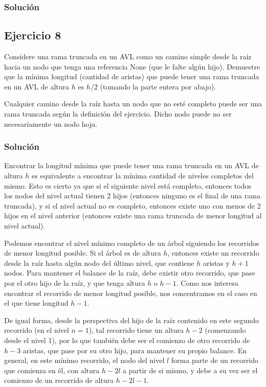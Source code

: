 \documentclass{article}
\begin{document}
\subsubsection*{Solución}



\subsection*{Ejercicio 8}
Considere una rama truncada en un AVL como un camino simple desde la raíz hacia un nodo que tenga una referencia None (que le falte algún hijo). Demuestre que la mínima longitud (cantidad de aristas) que puede tener una rama truncada en un AVL de altura $h$ es $h/2$ (tomando la parte entera por abajo).

Cualquier camino desde la raíz hasta un nodo que no esté completo puede ser una rama truncada según la definición del ejercicio. Dicho nodo puede no ser necesariamente un nodo hoja.
\subsubsection*{Solución}
Encontrar la longitud mínima que puede tener una rama truncada en un AVL de altura $h$ es equivalente a encontrar la mínima cantidad de niveles completos del mismo. Esto es cierto ya que si el siguiente nivel está completo, entonces todos los nodos del nivel actual tienen 2 hijos (entonces ninguno es el final de una rama truncada), y si el nivel actual no es completo, entonces existe uno con menos de 2 hijos en el nivel anterior (entonces existe una rama truncada de menor longitud al nivel actual).

Podemos encontrar el nivel mínimo completo de un árbol siguiendo los recorridos de menor longitud posible. Si el árbol es de altura $h$, entonces existe un recorrido desde la raíz hasta algún nodo del último nivel, que contiene $h$ aristas y $h+1$ nodos. Para mantener el balance de la raíz, debe existir otro recorrido, que pase por el otro hijo de la raíz, y que tenga altura $h$ o $h-1$. Como nos interesa encontrar el recorrido de menor longitud posible, nos concentramos en el caso en el que tiene longitud $h-1$.

De igual forma, desde la perspectiva del hijo de la raíz contenido en este segundo recorrido (en el nivel $n=1$), tal recorrido tiene un altura $h-2$ (comenzando desde el nivel 1), por lo que también debe ser el comienzo de otro recorrido de $h-3$ aristas, que pase por su otro hijo, para mantener su propio balance. En general, en este mínimo recorrido, el nodo del nivel $l$ forma parte de un recorrido que comienza en él, con altura $h-2l$ a partir de si mismo, y debe a su vez ser el comienzo de un recorrido de altura $h-2l-1$.
\end{document}
